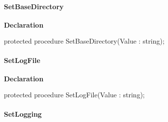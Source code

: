 \documentclass{report}
\newif\ifpdf
\begin{document}
\paragraph*{SetBaseDirectory}\hspace*{\fill}

\label{AbArcTyp.TAbArchive-SetBaseDirectory}
\begin{list}{}{
\setlength{\itemindent}{0cm}
\setlength{\listparindent}{0cm}
\setlength{\leftmargin}{\evensidemargin}
\addtolength{\leftmargin}{\tmplength}
\settowidth{\labelsep}{X}
\addtolength{\leftmargin}{\labelsep}
\setlength{\labelwidth}{\tmplength}
}
\item[\textbf{Declaration}\hfill]
\ifpdf
\begin{flushleft}
\fi
\begin{ttfamily}
protected procedure SetBaseDirectory(Value : string);\end{ttfamily}

\ifpdf
\end{flushleft}
\fi

\end{list}
\paragraph*{SetLogFile}\hspace*{\fill}

\label{AbArcTyp.TAbArchive-SetLogFile}
\begin{list}{}{
\setlength{\itemindent}{0cm}
\setlength{\listparindent}{0cm}
\setlength{\leftmargin}{\evensidemargin}
\addtolength{\leftmargin}{\tmplength}
\settowidth{\labelsep}{X}
\addtolength{\leftmargin}{\labelsep}
\setlength{\labelwidth}{\tmplength}
}
\item[\textbf{Declaration}\hfill]
\ifpdf
\begin{flushleft}
\fi
\begin{ttfamily}
protected procedure SetLogFile(Value : string);\end{ttfamily}

\ifpdf
\end{flushleft}
\fi

\end{list}
\paragraph*{SetLogging}\hspace*{\fill}
\end{document}
